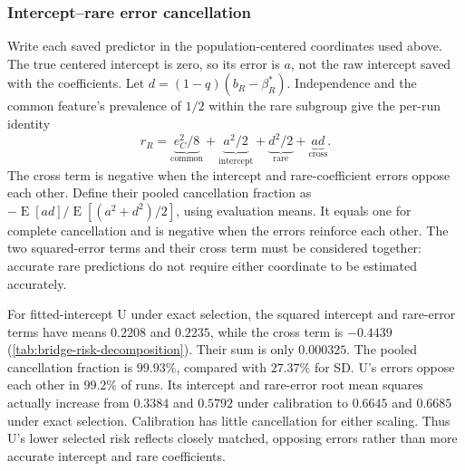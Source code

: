 \documentclass{alt2027}
\DeclareMathOperator{\E}{E}
\begin{document}
\subsubsection{Intercept--rare error cancellation}
\label{sec:bridge-cancellation}

Write each saved predictor in the population-centered coordinates used above.
The true centered intercept is zero, so its error is $a$, not the raw intercept
saved with the coefficients. Let $d = (1 - q)(b_R - \beta_R^*)$. Independence
and the common feature's prevalence of $1/2$ within the rare subgroup give the
per-run identity
\[
  r_R = \underbrace{e_C^2/8}_{\text{common}}
        + \underbrace{a^2/2}_{\text{intercept}}
        + \underbrace{d^2/2}_{\text{rare}}
        + \underbrace{ad}_{\text{cross}}.
\]
The cross term is negative when the intercept and rare-coefficient errors oppose
each other. Define their pooled cancellation fraction as
$-\E[ad]/\E[(a^2+d^2)/2]$, using evaluation means. It equals one for complete
cancellation and is negative when the errors reinforce each other. The two
squared-error terms and their cross term must be considered together: accurate
rare predictions do not require either coordinate to be estimated accurately.

\begin{table}[htbp]
  \centering
  
  \caption{
    Mean rare-risk contributions for the primary example in
    \cref{tab:bridge-selection}, using the same 4096 paired evaluation runs.
    Columns give $e_C^2/8$, $a^2/2$, $d^2/2$, $ad$, and their sum. Rounding can
    obscure exact addition. The baseline's centered intercept and cross terms
    are exactly zero.
  }
  \label{tab:bridge-risk-decomposition}
\end{table}

For fitted-intercept U under exact selection, the squared intercept and
rare-error terms have means $0.2208$ and $0.2235$, while the cross term is
$-0.4439$ (\cref{tab:bridge-risk-decomposition}). Their sum is only $0.000325$.
The pooled cancellation fraction is $99.93\%$, compared with $27.37\%$ for SD\@.
U's errors oppose each other in $99.2\%$ of runs. Its intercept and rare-error
root mean squares actually increase from $0.3384$ and $0.5792$ under calibration
to $0.6645$ and $0.6685$ under exact selection. Calibration has little
cancellation for either scaling. Thus U's lower selected risk reflects closely
matched, opposing errors rather than more accurate intercept and rare
coefficients.
\end{document}
